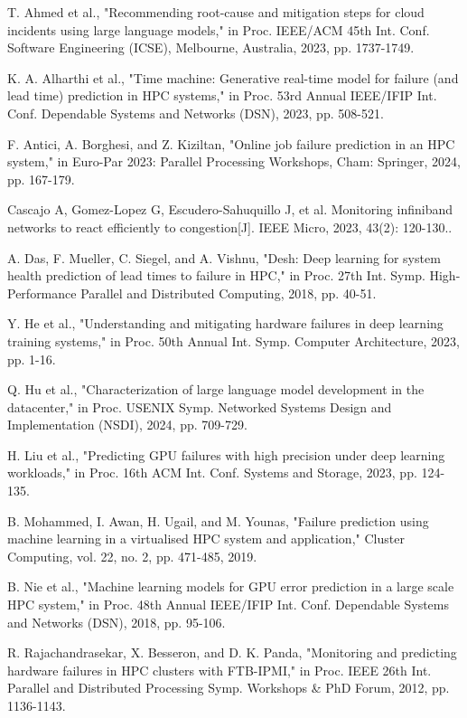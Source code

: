 \documentclass[conference]{IEEEtran}
\begin{document}
\begin{thebibliography}{00}
 T. Ahmed et al., "Recommending root-cause and mitigation steps for cloud incidents using large language models," in Proc. IEEE/ACM 45th Int. Conf. Software Engineering (ICSE), Melbourne, Australia, 2023, pp. 1737-1749.

 K. A. Alharthi et al., "Time machine: Generative real-time model for failure (and lead time) prediction in HPC systems," in Proc. 53rd Annual IEEE/IFIP Int. Conf. Dependable Systems and Networks (DSN), 2023, pp. 508-521.

 F. Antici, A. Borghesi, and Z. Kiziltan, "Online job failure prediction in an HPC system," in Euro-Par 2023: Parallel Processing Workshops, Cham: Springer, 2024, pp. 167-179.

 Cascajo A, Gomez-Lopez G, Escudero-Sahuquillo J, et al. Monitoring infiniband networks to react efficiently to congestion[J]. IEEE Micro, 2023, 43(2): 120-130..

 A. Das, F. Mueller, C. Siegel, and A. Vishnu, "Desh: Deep learning for system health prediction of lead times to failure in HPC," in Proc. 27th Int. Symp. High-Performance Parallel and Distributed Computing, 2018, pp. 40-51.

 Y. He et al., "Understanding and mitigating hardware failures in deep learning training systems," in Proc. 50th Annual Int. Symp. Computer Architecture, 2023, pp. 1-16.

 Q. Hu et al., "Characterization of large language model development in the datacenter," in Proc. USENIX Symp. Networked Systems Design and Implementation (NSDI), 2024, pp. 709-729.

 H. Liu et al., "Predicting GPU failures with high precision under deep learning workloads," in Proc. 16th ACM Int. Conf. Systems and Storage, 2023, pp. 124-135.

 B. Mohammed, I. Awan, H. Ugail, and M. Younas, "Failure prediction using machine learning in a virtualised HPC system and application," Cluster Computing, vol. 22, no. 2, pp. 471-485, 2019.

 B. Nie et al., "Machine learning models for GPU error prediction in a large scale HPC system," in Proc. 48th Annual IEEE/IFIP Int. Conf. Dependable Systems and Networks (DSN), 2018, pp. 95-106.

 R. Rajachandrasekar, X. Besseron, and D. K. Panda, "Monitoring and predicting hardware failures in HPC clusters with FTB-IPMI," in Proc. IEEE 26th Int. Parallel and Distributed Processing Symp. Workshops \& PhD Forum, 2012, pp. 1136-1143.


\end{thebibliography}
\end{document}
